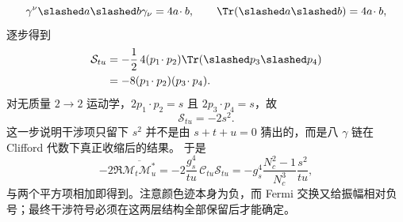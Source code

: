 \begin{derivation}[相同夸克散射的交换干涉]
\begin{equation*}
\gamma^\nu\slashed a\slashed b\gamma_\nu=4a\!\cdot b,
\qquad
\Tr(\slashed a\slashed b)=4a\!\cdot b,
\end{equation*}
逐步得到
\begin{align*}
\mathcal S_{tu}
&=-\frac12\,4(p_1\!\cdot p_2)\Tr(\slashed p_3\slashed p_4)\\
&=-8(p_1\!\cdot p_2)(p_3\!\cdot p_4).
\end{align*}
对无质量 $2\to2$ 运动学，$2p_1\!\cdot p_2=s$ 且 $2p_3\!\cdot p_4=s$，故
\begin{equation*}
{\mathcal S_{tu}=-2s^2.}
\end{equation*}
这一步说明干涉项只留下 $s^2$ 并不是由 $s+t+u=0$ 猜出的，而是八 $\gamma$ 链在 Clifford 代数下真正收缩后的结果。
于是
\begin{equation*}
-2\Re\overline{\mathcal M_t\mathcal M_u^*}
=-2\frac{g_s^4}{tu}\,\mathcal C_{tu}\mathcal S_{tu}
=-g_s^4\frac{N_c^2-1}{N_c^3}\frac{s^2}{tu},
\end{equation*}
与两个平方项相加即得到。注意颜色迹本身为负，而 Fermi 交换又给振幅相对负号；最终干涉符号必须在这两层结构全部保留后才能确定。
\end{derivation}
